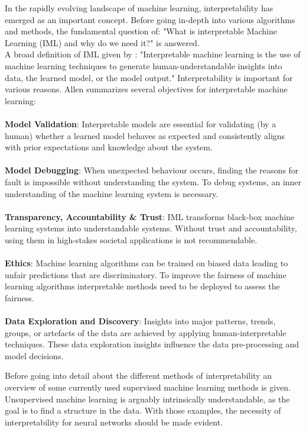In the rapidly evolving landscape of machine learning, interpretability has emerged as an important concept. Before going in-depth into various algorithms and methods, the fundamental question of: "What is interpretable Machine Learning (IML) and why do we need it?" is answered.
\\
A broad definition of IML given by \cite{allen2023interpretable}: "Interpretable machine learning is the use of machine learning techniques to generate human-understandable insights into data, the learned model, or the model output." Interpretability is important for various reasons. Allen\cite{allen2023interpretable} summarizes several objectives for interpretable machine learning: 
\\\\
\textbf{Model Validation}: Interpretable models are essential for validating (by a human) whether a learned model behaves as expected and consistently aligns with prior expectations and knowledge about the system.
\\\\
\textbf{Model Debugging}: When unexpected behaviour occurs, finding the reasons for fault is impossible without understanding the system. To debug systems, an inner understanding of the machine learning system is necessary.
\\\\
\textbf{Transparency, Accountability \& Trust}: IML transforms black-box machine learning systems into understandable systems. Without trust and accountability, using them in high-stakes societal applications is not recommendable.
\\\\
\textbf{Ethics}: Machine learning algorithms can be trained on biased data leading to unfair predictions that are discriminatory. To improve the fairness of machine learning algorithms interpretable methods need to be deployed to assess the fairness. 
\\\\
\textbf{Data Exploration and Discovery}: Insights into major patterns, trends, groups, or artefacts of the data are achieved by applying human-interpretable techniques. These data exploration insights influence the data pre-processing and model decisions. 

Before going into detail about the different methods of interpretability an overview of some currently used supervised machine learning methods is given. Unsupervised machine learning is arguably intrinsically understandable, as the goal is to find a structure in the data. \cite{allen2023interpretable} With those examples, the necessity of interpretability for neural networks should be made evident.

